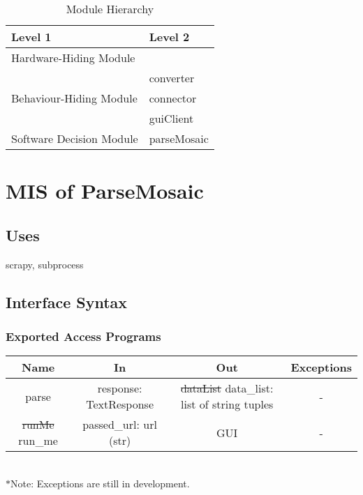 \documentclass[12pt, titlepage]{article}
\begin{document}
\begin{table}[h!]
\centering
\begin{tabular}{p{} p{}}
\toprule
\textbf{Level 1} & \textbf{Level 2}\\
\midrule

{Hardware-Hiding Module} & ~ \\
\midrule

\multirow{3}{0.3\textwidth}{Behaviour-Hiding Module} & converter\\
& connector\\
& guiClient\\
\midrule

\multirow{1}{0.3\textwidth}{Software Decision Module} & parseMosaic\\
\bottomrule

\end{tabular}
\caption{Module Hierarchy}
\label{TblMH}
\end{table}
\newpage

\section{MIS of ParseMosaic} \label{SecM2}
\subsection{Uses}
scrapy, subprocess
\subsection{Interface Syntax}
\subsubsection{Exported Access Programs}
\begin{tabular}[pos]{|c|c|c|c|}
	\hline
	\textbf{Name}& \textbf{In} & \textbf{Out} & \textbf{Exceptions} \\ \hline
	parse & response: TextResponse & \sout{dataList} \color{blue}data\_list\color{black}: list of string tuples & -\\ \hline %
	\sout{runMe}  \color{blue}run\_me\color{black} & passed\_url: url (str) & GUI & -\\ \hline
			
\end{tabular}\\
$*$Note: Exceptions are still in development.
\end{document}

